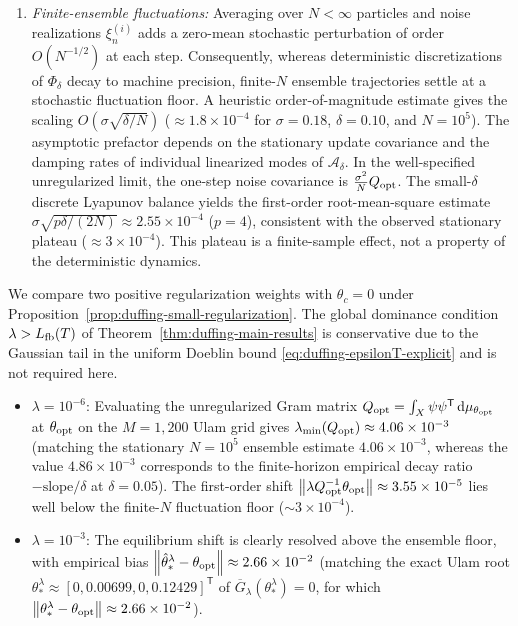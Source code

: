 \begin{enumerate}[label=(\alph*)]
   \item \emph{Finite-ensemble fluctuations:} Averaging over $N < \infty$ particles and noise realizations $\xi_n^{(i)}$ adds a zero-mean stochastic perturbation of order $O(N^{-1/2})$ at each step. Consequently, whereas deterministic discretizations of $\Phi_\delta$ decay to machine precision, finite-$N$ ensemble trajectories settle at a stochastic fluctuation floor. A heuristic order-of-magnitude estimate gives the scaling $O(\sigma\sqrt{\delta/N})$ ($\approx 1.8\times 10^{-4}$ for $\sigma=0.18$, $\delta=0.10$, and $N=10^5$). The asymptotic prefactor depends on the stationary update covariance and the damping rates of individual linearized modes of $\mathcal{A}_\delta$. In the well-specified unregularized limit, the one-step noise covariance is $\frac{\sigma^2}{N}Q_{\rm opt}$. The small-$\delta$ discrete Lyapunov balance yields the first-order root-mean-square estimate $\sigma\sqrt{p\delta/(2N)} \approx 2.55\times 10^{-4}$ ($p=4$), consistent with the observed stationary plateau ($\approx 3\times 10^{-4}$). This plateau is a finite-sample effect, not a property of the deterministic dynamics.
\end{enumerate}

We compare two positive regularization weights with $\theta_c = 0$ under Proposition~\ref{prop:duffing-small-regularization}. The global dominance condition $\lambda > L_{\rm fb}(T)$ of Theorem~\ref{thm:duffing-main-results} is conservative due to the Gaussian tail in the uniform Doeblin bound \eqref{eq:duffing-epsilonT-explicit} and is not required here.
\begin{itemize}
    \item $\lambda = 10^{-6}$: Evaluating the unregularized Gram matrix $Q_{\rm opt} = \int_X \psi\psi^{\mathsf T}\,\mathrm{d}\mu_{\theta_{\rm opt}}$ at $\theta_{\rm opt}$ on the $M=1{,}200$ Ulam grid gives $\lambda_{\min}(Q_{\rm opt}) \approx 4.06\times 10^{-3}$ (matching the stationary $N=10^5$ ensemble estimate $4.06\times 10^{-3}$, whereas the value $4.86\times 10^{-3}$ corresponds to the finite-horizon empirical decay ratio $-\text{slope}/\delta$ at $\delta=0.05$). The first-order shift $\left\lVert \lambda Q_{\rm opt}^{-1}\theta_{\rm opt}\right\rVert \approx 3.55\times 10^{-5}$ lies well below the finite-$N$ fluctuation floor ($\sim 3\times 10^{-4}$).
    \item $\lambda = 10^{-3}$: The equilibrium shift is clearly resolved above the ensemble floor, with empirical bias $\left\lVert \hat{\theta}_*^\lambda - \theta_{\rm opt}\right\rVert \approx 2.66\times 10^{-2}$ (matching the exact Ulam root $\theta_*^\lambda \approx [0, 0.00699, 0, 0.12429]^{\mathsf T}$ of $\overline G_\lambda(\theta_*^\lambda)=0$, for which $\left\lVert \theta_*^\lambda - \theta_{\rm opt}\right\rVert \approx 2.66\times 10^{-2}$).
\end{itemize}

